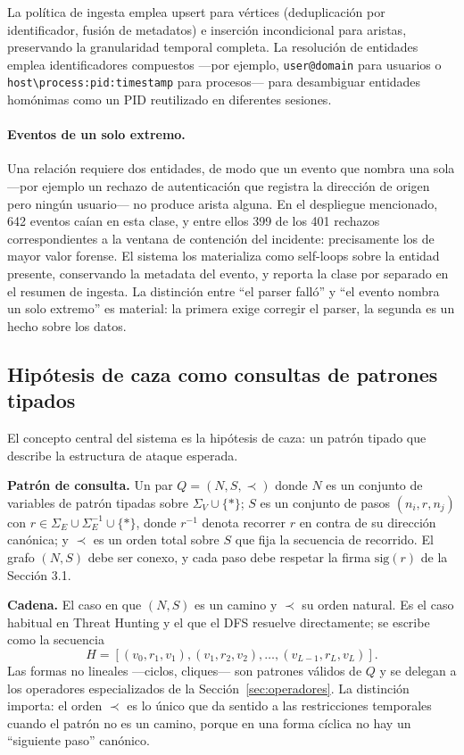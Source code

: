 \documentclass[11pt,a4paper]{article}
\newcommand{\code}[1]{\texttt{#1}}
\begin{document}
La política de ingesta emplea upsert para vértices (deduplicación por
identificador, fusión de metadatos) e inserción incondicional para aristas,
preservando la granularidad temporal completa. La resolución de entidades
emplea identificadores compuestos ---por ejemplo, \code{user@domain} para
usuarios o \code{host\textbackslash process:pid:timestamp} para procesos---
para desambiguar entidades homónimas como un PID reutilizado en diferentes
sesiones.

\paragraph{Eventos de un solo extremo.} Una relación requiere dos entidades,
de modo que un evento que nombra una sola ---por ejemplo un rechazo de
autenticación que registra la dirección de origen pero ningún usuario--- no
produce arista alguna. En el despliegue mencionado, 642 eventos caían en esta
clase, y entre ellos 399 de los 401 rechazos correspondientes a la ventana de
contención del incidente: precisamente los de mayor valor forense. El sistema
los materializa como self-loops sobre la entidad presente, conservando la
metadata del evento, y reporta la clase por separado en el resumen de ingesta.
La distinción entre ``el parser falló'' y ``el evento nombra un solo extremo''
es material: la primera exige corregir el parser, la segunda es un hecho sobre
los datos.

\subsection{Hipótesis de caza como consultas de patrones tipados}
\label{sec:hipotesis}
El concepto central del sistema es la hipótesis de caza: un patrón tipado que
describe la estructura de ataque esperada.

\textbf{Patrón de consulta.} Un par $Q = (N, S, \prec)$ donde $N$ es un
conjunto de variables de patrón tipadas sobre $\Sigma_V \cup \{*\}$; $S$ es un
conjunto de pasos $(n_i, r, n_j)$ con
$r \in \Sigma_E \cup \Sigma_E^{-1} \cup \{*\}$, donde $r^{-1}$ denota recorrer
$r$ en contra de su dirección canónica; y $\prec$ es un orden total sobre $S$
que fija la secuencia de recorrido. El grafo $(N, S)$ debe ser conexo, y cada
paso debe respetar la firma $\mathrm{sig}(r)$ de la Sección 3.1.

\textbf{Cadena.} El caso en que $(N, S)$ es un camino y $\prec$ su orden
natural. Es el caso habitual en Threat Hunting y el que el DFS resuelve
directamente; se escribe como la secuencia
\[
H = [(v_0, r_1, v_1), (v_1, r_2, v_2), \ldots, (v_{L-1}, r_L, v_L)].
\]
Las formas no lineales ---ciclos, cliques--- son patrones válidos de $Q$ y se
delegan a los operadores especializados de la Sección~\ref{sec:operadores}. La
distinción importa: el orden $\prec$ es lo único que da sentido a las
restricciones temporales cuando el patrón no es un camino, porque en una forma
cíclica no hay un ``siguiente paso'' canónico.
\end{document}

